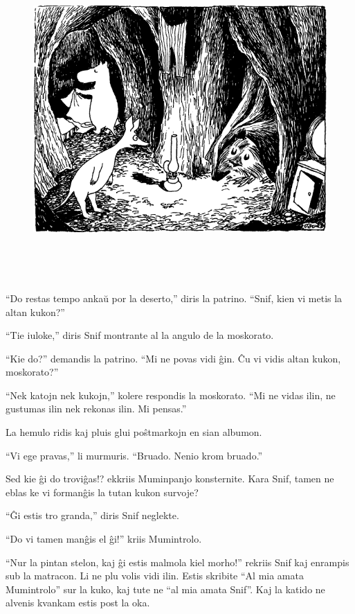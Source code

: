 \begin{figure}[htbp]
\centering
\includegraphics[width=449pt,height=346pt]{9-6.png}
\caption{}
\label{9-6}
\end{figure}

``Do restas tempo ankaŭ por la deserto,'' diris la patrino. ``Snif, kien vi metis la altan kukon?''

``Tie iuloke,'' diris Snif montrante al la angulo de la moskorato.

``Kie do?'' demandis la patrino. ``Mi ne povas vidi ĝin. Ĉu vi vidis altan kukon, moskorato?''

``Nek katojn nek kukojn,'' kolere respondis la moskorato. ``Mi ne vidas ilin, ne gustumas ilin nek rekonas ilin. Mi pensas.''

La hemulo ridis kaj pluis glui poŝtmarkojn en sian albumon.

``Vi ege pravas,'' li murmuris. ``Bruado. Nenio krom bruado.''

Sed kie ĝi do troviĝas!? ekkriis Muminpanjo konsternite. Kara Snif, tamen ne eblas ke vi formanĝis la tutan kukon survoje?

``Ĝi estis tro granda,'' diris Snif neglekte.

``Do vi tamen manĝis el ĝi!'' kriis Mumintrolo.

``Nur la pintan stelon, kaj ĝi estis malmola kiel morho!'' rekriis Snif kaj enrampis sub la matracon. Li ne plu volis vidi ilin. Estis skribite ``Al mia amata Mumintrolo'' sur la kuko, kaj tute ne ``al mia amata Snif''. Kaj la katido ne alvenis kvankam estis post la oka.

